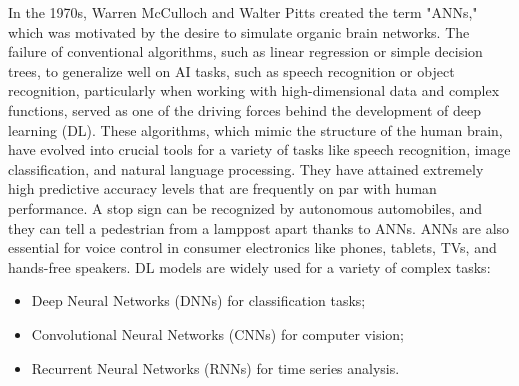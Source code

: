 In the 1970s, Warren McCulloch and Walter Pitts created the term "ANNs," which was motivated by the desire to simulate organic brain networks. The failure of conventional algorithms, such as linear regression or simple decision trees, to generalize well on AI tasks, such as speech recognition or object recognition, particularly when working with high-dimensional data and complex functions, served as one of the driving forces behind the development of deep learning (DL). These algorithms, which mimic the structure of the human brain, have evolved into crucial tools for a variety of tasks like speech recognition, image classification, and natural language processing. They have attained extremely high predictive accuracy levels that are frequently on par with human performance. A stop sign can be recognized by autonomous automobiles, and they can tell a pedestrian from a lamppost apart thanks to ANNs. ANNs are also essential for voice control in consumer electronics like phones, tablets, TVs, and hands-free speakers. DL models are widely used for a variety of complex tasks:
\begin{itemize}
    \item Deep Neural Networks (DNNs) for classification tasks;
    \item Convolutional Neural Networks (CNNs) for computer vision;
    \item Recurrent Neural Networks (RNNs) for time series analysis.
\end{itemize}

